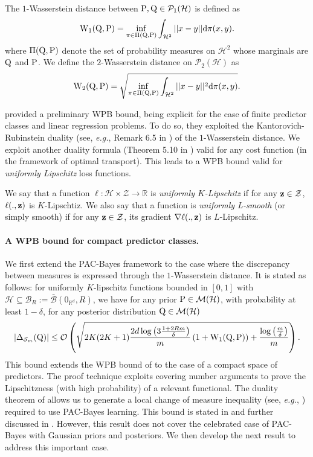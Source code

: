 \begin{definition}
\label{def: wasserstein}
The $1$-Wasserstein distance between $\P,\Q \in \mathcal{P}_1(\mathcal{H})$ is defined as
\[ \W_{1}(\Q,\P) = \inf_{\pi \in \Pi(\Q,\P)} \int_{\mathcal{H}^2} ||x-y||\mathrm{d}\pi(x,y). \]
where $\Pi(\Q,\P)$ denote the set of probability measures on $\mathcal{H}^2$ whose marginals are $\Q$ and $\P$.
We define the $2$-Wasserstein distance on $\mathcal{P}_2(\mathcal{H})$ as
\[ \W_{2}(\Q,\P) = \sqrt{\inf_{\pi \in \Pi(\Q,\P)} \int_{\mathcal{H}^2} ||x-y||^2\mathrm{d}\pi(x,y)}. \]
\end{definition}
\citet{amit2022integral} provided a preliminary WPB bound, being explicit for the case of finite predictor classes and linear regression problems. To do so, they exploited the Kantorovich-Rubinstein duality (see, \emph{e.g.}, Remark 6.5 in \citealp{villani2009optimal}) of the $1$-Wasserstein distance. We exploit another duality formula (Theorem 5.10 in \citealp{villani2009optimal}) valid for any cost function (in the framework of optimal transport). This leads to a WPB bound valid for \emph{uniformly Lipschitz} loss functions.
\begin{definition}
\label{def: unif_lpz}
We say that a function $\ell:\mathcal{H}\times\mathcal{Z}\rightarrow \mathbb{R}$ is \emph{uniformly $K$-Lipschitz} if for any $\z\in\mathcal{Z}$, $\ell(.,\z)$ is $K$-Lipschtiz. We also say that a function is \emph{uniformly L-smooth} (or simply smooth) if for any $\z\in\mathcal{Z}$, its gradient $\nabla \ell(.,\z)$ is $L$-Lipschitz.
\end{definition}

\paragraph{A WPB bound for compact predictor classes.}
We first extend the PAC-Bayes framework to the case where the discrepancy between measures is expressed through the $1$-Wasserstein distance. It is stated as follows: for uniformly $K$-lipschitz functions bounded in $[0,1]$ with  $\mathcal{H}\subseteq \mathcal{B}_R:= \bar{\mathcal{B}}(0_{\mathbb{R}^d},R)$, we have for any prior $\P\in\mathcal{M}(\mathcal{H})$, with probability at least $1-\delta$, for any posterior distribution $\Q\in\mathcal{M}(\mathcal{H})$
\[ |\Delta_{\Sm}(\Q)| \leq \mathcal{O}\left(\sqrt{2K(2K+1)\frac{2d\log\left(3\frac{1 +2Rm }{\delta}\right)}{m} \left(1+\W_{1}(\Q,\P)  \right) +\frac{\log\left( \frac{m}{\delta} \right)}{m} } \right). \]
This bound extends the WPB bound of \citet{amit2022integral} to the case of a compact space of predictors. The proof technique exploits covering number arguments to prove the Lipschitzness (with high probability) of a relevant functional. The duality theorem of \citet[Theorem 5.10]{villani2009optimal} allows us to generate a local change of measure inequality (see, \emph{e.g.}, \citealp{donsker1976asymp}) required to use PAC-Bayes learning.
This bound is stated in  and further discussed in . However, this result does not cover the celebrated case of PAC-Bayes with Gaussian priors and posteriors. We then develop the next result to address this important case.

